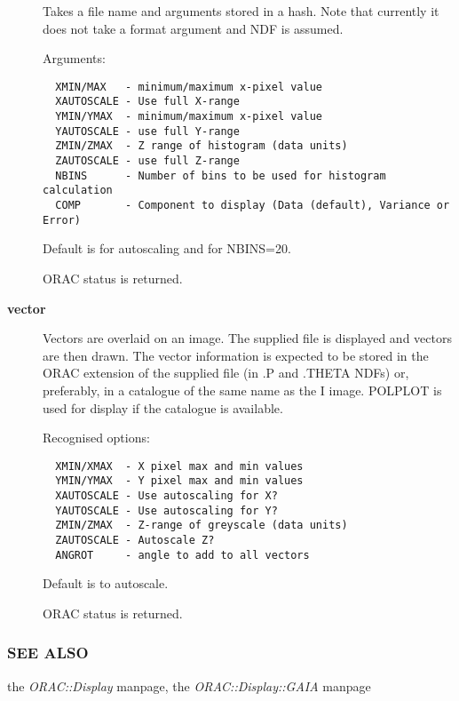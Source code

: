 \begin{description}
Takes a file name and arguments stored in a hash.
Note that currently it does not take a format argument
and NDF is assumed.



Arguments:

\begin{verbatim}
  XMIN/MAX   - minimum/maximum x-pixel value
  XAUTOSCALE - Use full X-range
  YMIN/YMAX  - minimum/maximum x-pixel value
  YAUTOSCALE - use full Y-range
  ZMIN/ZMAX  - Z range of histogram (data units)
  ZAUTOSCALE - use full Z-range
  NBINS      - Number of bins to be used for histogram calculation
  COMP       - Component to display (Data (default), Variance or Error)
\end{verbatim}


Default is for autoscaling and for NBINS=20.



ORAC status is returned.

\item[\textbf{vector}] \mbox{}

Vectors are overlaid on an image. The supplied file is displayed
and vectors are then drawn. The vector information is expected
to be stored in the ORAC extension of the supplied file
(in .P and .THETA NDFs) or, preferably, in a catalogue of the
same name as the I image. POLPLOT is used for display if
the catalogue is available.



Recognised options:

\begin{verbatim}
  XMIN/XMAX  - X pixel max and min values
  YMIN/YMAX  - Y pixel max and min values
  XAUTOSCALE - Use autoscaling for X?
  YAUTOSCALE - Use autoscaling for Y?
  ZMIN/ZMAX  - Z-range of greyscale (data units)
  ZAUTOSCALE - Autoscale Z?
  ANGROT     - angle to add to all vectors
\end{verbatim}


Default is to autoscale.



ORAC status is returned.

\end{description}
\subsubsection*{SEE ALSO\label{ORAC::Display::KAPVIEW_SEE_ALSO}}

the \emph{ORAC::Display} manpage, the \emph{ORAC::Display::GAIA} manpage

